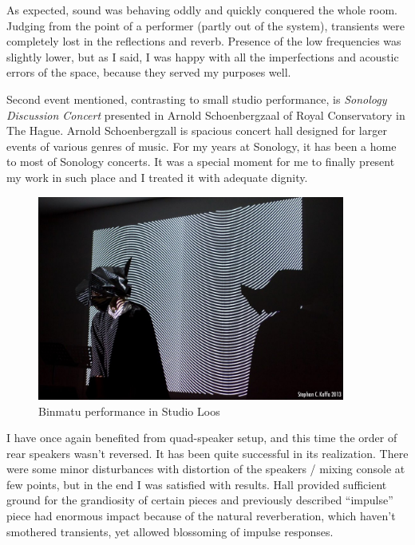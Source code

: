 \documentclass[12pt,a4paper,oneside]{report}
\begin{document}
As expected, sound was behaving oddly and quickly conquered the whole room. Judging from the point of a performer (partly out of the system), transients were completely lost in the reflections and reverb. Presence of the low frequencies was slightly lower, but as I said, I was happy with all the imperfections and acoustic errors of the space, because they served my purposes well.

Second event mentioned, contrasting to small studio performance, is \emph{Sonology Discussion Concert} presented in Arnold Schoenbergzaal of Royal Conservatory in The Hague. Arnold Schoenbergzall is spacious concert hall designed for larger events of various genres of music. For my years at Sonology, it has been a home to most of Sonology concerts. It was a special moment for me to finally present my work in such place and I treated it with adequate dignity.

\begin{figure}  
  \centering
    \includegraphics[width=0.9\textwidth]{img/binmatu_perfo}
	\caption{Binmatu performance in Studio Loos}
	\label{fig:binmatu_perfo}
\end{figure}

I have once again benefited from quad-speaker setup, and this time the order of rear speakers wasn't reversed. It has been quite successful in its realization. There were some minor disturbances with distortion of the speakers / mixing console at few points, but in the end I was satisfied with results. Hall provided sufficient ground for the grandiosity of certain pieces and previously described ``impulse'' piece had enormous impact because of the natural reverberation, which haven't smothered transients, yet allowed blossoming of impulse responses.
\end{document}

